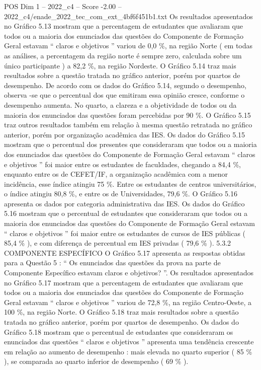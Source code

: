 \begin{textsample}{POS Dim 1 – 2022\_c4 – Score -2.00 – 2022\_c4/enade\_2022\_tec\_com\_ext\_4bf6f451b1.txt}
Os resultados apresentados no Gráfico 5.13 mostram que a percentagem de estudantes que avaliaram que todos ou a maioria dos enunciados das questões do Componente de Formação Geral estavam “ claros e objetivos ” variou de 0,0 \%, na região Norte ( em todas as análises, a percentagem da região norte é sempre zero, calculada sobre um único participante ) a 82,2 \%, na região Nordeste.
O Gráfico 5.14 traz mais resultados sobre a questão tratada no gráfico anterior, porém por quartos de desempenho.
De acordo com os dados do Gráfico 5.14, segundo o desempenho, observa -se que o percentual dos que emitiram essa opinião cresce, conforme o desempenho aumenta.
No quarto, a clareza e a objetividade de todos ou da maioria dos enunciados das questões foram percebidas por 90 \%.
O Gráfico 5.15 traz outros resultados também em relação à mesma questão retratada no gráfico anterior, porém por organização acadêmica das IES.
Os dados do Gráfico 5.15 mostram que o percentual dos presentes que consideraram que todos ou a maioria dos enunciados das questões do Componente de Formação Geral estavam “ claros e objetivos ” foi maior entre os estudantes de faculdades, chegando a 84,4 \%, enquanto entre os de CEFET/IF, a organização acadêmica com a menor incidência, esse índice atingiu 75 \%.
Entre os estudantes de centros universitários, o índice atingiu 80,8 \%, e entre os de Universidades, 79,6 \%.
O Gráfico 5.16 apresenta os dados por categoria administrativa das IES.
Os dados do Gráfico 5.16 mostram que o percentual de estudantes que consideraram que todos ou a maioria dos enunciados das questões do Componente de Formação Geral estavam “ claros e objetivos ” foi maior entre os estudantes de cursos de IES públicas ( 85,4 \% ), e com diferença de percentual em IES privadas ( 79,6 \% ). 5.3.2 COMPONENTE ESPECÍFICO O Gráfico 5.17 apresenta as respostas obtidas para a Questão 5 : “ Os enunciados das questões da prova na parte de Componente Específico estavam claros e objetivos? ”.
Os resultados apresentados no Gráfico 5.17 mostram que a percentagem de estudantes que avaliaram que todos ou a maioria dos enunciados das questões do Componente de Formação Geral estavam “ claros e objetivos ” variou de 72,8 \%, na região Centro-Oeste, a 100 \%, na região Norte.
O Gráfico 5.18 traz mais resultados sobre a questão tratada no gráfico anterior, porém por quartos de desempenho.
Os dados do Gráfico 5.18 mostram que o percentual de estudantes que consideraram os enunciados das questões “ claros e objetivos ” apresenta uma tendência crescente em relação ao aumento de desempenho : mais elevada no quarto superior ( 85 \% ), se comparada ao quarto inferior de desempenho ( 69 \% ).

\end{textsample}

